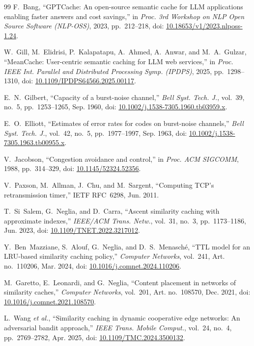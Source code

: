 \documentclass[11pt,a4paper]{article}
\begin{document}
\begin{thebibliography}{99}
F.~Bang, ``GPTCache: An open-source semantic cache for LLM applications enabling faster answers
and cost savings,'' in \emph{Proc. 3rd Workshop on NLP Open Source Software (NLP-OSS)}, 2023,
pp.~212--218, doi: \href{https://doi.org/10.18653/v1/2023.nlposs-1.24}{10.18653/v1/2023.nlposs-1.24}.

W.~Gill, M.~Elidrisi, P.~Kalapatapu, A.~Ahmed, A.~Anwar, and M.~A.~Gulzar, ``MeanCache:
User-centric semantic caching for LLM web services,'' in \emph{Proc. IEEE Int. Parallel and
Distributed Processing Symp. (IPDPS)}, 2025, pp.~1298--1310,
doi: \href{https://doi.org/10.1109/IPDPS64566.2025.00117}{10.1109/IPDPS64566.2025.00117}.

E.~N.~Gilbert, ``Capacity of a burst-noise channel,'' \emph{Bell Syst. Tech. J.}, vol.~39, no.~5,
pp.~1253--1265, Sep. 1960,
doi: \href{https://doi.org/10.1002/j.1538-7305.1960.tb03959.x}{10.1002/j.1538-7305.1960.tb03959.x}.

E.~O.~Elliott, ``Estimates of error rates for codes on burst-noise channels,'' \emph{Bell Syst.
Tech. J.}, vol.~42, no.~5, pp.~1977--1997, Sep. 1963,
doi: \href{https://doi.org/10.1002/j.1538-7305.1963.tb00955.x}{10.1002/j.1538-7305.1963.tb00955.x}.

V.~Jacobson, ``Congestion avoidance and control,'' in \emph{Proc. ACM SIGCOMM}, 1988,
pp.~314--329, doi: \href{https://doi.org/10.1145/52324.52356}{10.1145/52324.52356}.

V.~Paxson, M.~Allman, J.~Chu, and M.~Sargent, ``Computing TCP's retransmission timer,'' IETF
RFC~6298, Jun. 2011.

T.~Si~Salem, G.~Neglia, and D.~Carra, ``Ascent similarity caching with approximate indexes,''
\emph{IEEE/ACM Trans. Netw.}, vol.~31, no.~3, pp.~1173--1186, Jun. 2023,
doi: \href{https://doi.org/10.1109/TNET.2022.3217012}{10.1109/TNET.2022.3217012}.

Y.~Ben~Mazziane, S.~Alouf, G.~Neglia, and D.~S.~Menasch\'{e}, ``TTL model for an LRU-based
similarity caching policy,'' \emph{Computer Networks}, vol.~241, Art. no.~110206, Mar. 2024,
doi: \href{https://doi.org/10.1016/j.comnet.2024.110206}{10.1016/j.comnet.2024.110206}.

M.~Garetto, E.~Leonardi, and G.~Neglia, ``Content placement in networks of similarity caches,''
\emph{Computer Networks}, vol.~201, Art. no.~108570, Dec. 2021,
doi: \href{https://doi.org/10.1016/j.comnet.2021.108570}{10.1016/j.comnet.2021.108570}.

L.~Wang \emph{et al.}, ``Similarity caching in dynamic cooperative edge networks: An adversarial
bandit approach,'' \emph{IEEE Trans. Mobile Comput.}, vol.~24, no.~4, pp.~2769--2782, Apr. 2025,
doi: \href{https://doi.org/10.1109/TMC.2024.3500132}{10.1109/TMC.2024.3500132}.

\end{thebibliography}
\end{document}
